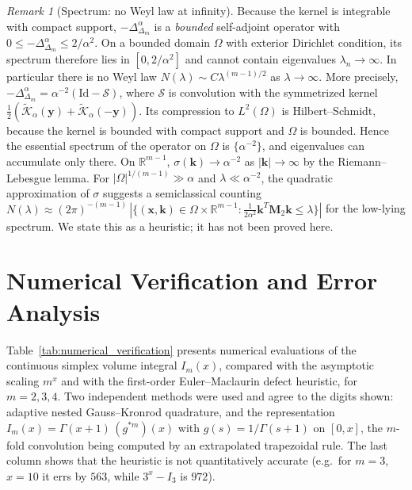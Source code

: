 \documentclass[11pt,a4paper]{article}
\theoremstyle{plain}
\theoremstyle{definition}
\theoremstyle{remark}
\newtheorem{remark}[theorem]{Remark}
\numberwithin{equation}{section}
\providecommand{\Id}{\mathrm{Id}}
\begin{document}
\begin{remark}[Spectrum: no Weyl law at infinity]
\label{rem:weyl}
Because the kernel is integrable with compact support, $-\Delta_{\Delta_m}^\alpha$ is a \emph{bounded} self-adjoint operator with $0 \le -\Delta_{\Delta_m}^\alpha \le 2/\alpha^2$. On a bounded domain $\Omega$ with exterior Dirichlet condition, its spectrum therefore lies in $[0, 2/\alpha^2]$ and cannot contain eigenvalues $\lambda_n \to \infty$. In particular there is no Weyl law $N(\lambda) \sim C\lambda^{(m-1)/2}$ as $\lambda \to \infty$. More precisely, $-\Delta^\alpha_{\Delta_m} = \alpha^{-2}(\Id - \mathcal{S})$, where $\mathcal{S}$ is convolution with the symmetrized kernel $\frac12(\widetilde{\mathcal{K}}_\alpha(\mathbf{y}) + \widetilde{\mathcal{K}}_\alpha(-\mathbf{y}))$. Its compression to $L^2(\Omega)$ is Hilbert--Schmidt, because the kernel is bounded with compact support and $\Omega$ is bounded. Hence the essential spectrum of the operator on $\Omega$ is $\{\alpha^{-2}\}$, and eigenvalues can accumulate only there. On $\mathbb{R}^{m-1}$, $\sigma(\mathbf{k}) \to \alpha^{-2}$ as $|\mathbf{k}| \to \infty$ by the Riemann--Lebesgue lemma. For $|\Omega|^{1/(m-1)} \gg \alpha$ and $\lambda \ll \alpha^{-2}$, the quadratic approximation of $\sigma$ suggests a semiclassical counting $N(\lambda) \approx (2\pi)^{-(m-1)}\,|\{(\mathbf{x},\mathbf{k}) \in \Omega \times \mathbb{R}^{m-1} : \frac{1}{2\alpha^2}\mathbf{k}^T\mathbf{M}_2\mathbf{k} \le \lambda\}|$ for the low-lying spectrum. We state this as a heuristic; it has not been proved here.
\end{remark}

\section{Numerical Verification and Error Analysis}

Table~\ref{tab:numerical_verification} presents numerical evaluations of the continuous simplex volume integral $I_m(x)$, compared with the asymptotic scaling $m^x$ and with the first-order Euler--Maclaurin defect heuristic, for $m = 2, 3, 4$. Two independent methods were used and agree to the digits shown: adaptive nested Gauss--Kronrod quadrature, and the representation $I_m(x) = \Gamma(x+1)\,(g^{*m})(x)$ with $g(s) = 1/\Gamma(s+1)$ on $[0, x]$, the $m$-fold convolution being computed by an extrapolated trapezoidal rule. The last column shows that the heuristic is not quantitatively accurate (e.g.\ for $m = 3$, $x = 10$ it errs by $563$, while $3^x - I_3$ is $972$).
\end{document}
